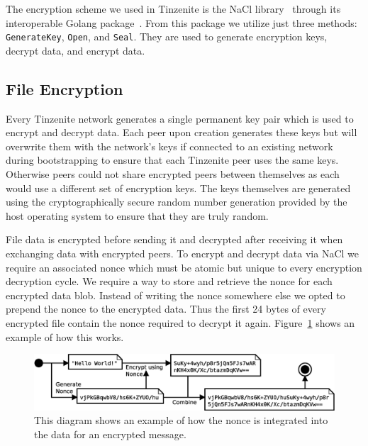The encryption scheme we used in Tinzenite is the NaCl library~\cite{bernstein2012security} through its interoperable Golang package~\cite{web:site:golang:box}.%
From this package we utilize just three methods: \texttt{GenerateKey}, \texttt{Open}, and \texttt{Seal}.
They are used to generate encryption keys, decrypt data, and encrypt data.

\subsection{File Encryption}
\label{sub:File Encryption}

Every Tinzenite network generates a single permanent key pair which is used to encrypt and decrypt data.
Each peer upon creation generates these keys but will overwrite them with the network's keys if connected to an existing network during bootstrapping to ensure that each Tinzenite peer uses the same keys.
Otherwise peers could not share encrypted peers between themselves as each would use a different set of encryption keys.
The keys themselves are generated using the cryptographically secure random number generation provided by the host operating system to ensure that they are truly random.

File data is encrypted before sending it and decrypted after receiving it when exchanging data with encrypted peers.
To encrypt and decrypt data via NaCl we require an associated nonce which must be atomic but unique to every encryption decryption cycle.
We require a way to store and retrieve the nonce for each encrypted data blob.
Instead of writing the nonce somewhere else we opted to prepend the nonce to the encrypted data. %
Thus the first 24 bytes of every encrypted file contain the nonce required to decrypt it again.
Figure~\ref{fig:enc_algo} shows an example of how this works.

\begin{figure}[htp]
\centering
    \includegraphics[width=14cm]{diagram/enc_algo}
\caption[Encryption Example]{This diagram shows an example of how the nonce is integrated into the data for an encrypted message.}
\label{fig:enc_algo}
\end{figure}

